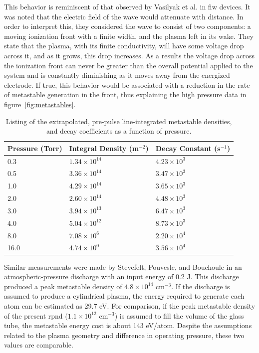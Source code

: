 This behavior is reminiscent of that observed by Vasilyak et al.
\cite{Vasilyak1994} in \acs{fiw} devices. It was noted that the electric field
of the wave would attenuate with distance. In order to interpret this, they
considered the wave to consist of two components: a moving ionization front with
a finite width, and the plasma left in its wake. They state that the plasma,
with its finite conductivity, will have some voltage drop across it, and as it
grows, this drop increases. As a results the voltage drop across the ionization
front can never be greater than the overall potential applied to the system and
is constantly diminishing as it moves away from the energized electrode. If
true, this behavior would be associated with a reduction in the rate of
metastable generation in the front, thus explaining the high pressure data in
figure~\ref{fig:metastables}.

\begin{table}
  \centering
  \caption{Listing of the extrapolated, pre-pulse line-integrated metastable 
  densities, and decay coefficients as a function of pressure.}
  \begin{tabular}{lll}
    \toprule
    Pressure (Torr) & Integral Density (m$^{-2}$) & Decay Constant (s$^{-1}$) \\
    \midrule
    0.3  & $1.34\times10^{14}$ & $4.23\times10^3$ \\
    0.5  & $3.36\times10^{14}$ & $3.47\times10^3$ \\
    1.0  & $4.29\times10^{14}$ & $3.65\times10^3$ \\
    2.0  & $2.60\times10^{14}$ & $4.48\times10^3$ \\
    3.0  & $3.94\times10^{13}$ & $6.47\times10^3$ \\
    4.0  & $5.04\times10^{12}$ & $8.73\times10^3$ \\
    8.0  & $7.08\times10^{6}$  & $2.20\times10^4$ \\
    16.0 & $4.74\times10^{0}$  & $3.56\times10^4$ \\
    \bottomrule
  \end{tabular}
  \label{tbl:prepulse}
\end{table}

Similar measurements were made by Stevefelt, Pouvesle, and Bouchoule
\cite{Pouvesle1988} in an atmospheric-pressure discharge with an input energy of
0.2 J. This discharge produced a peak metastable density of $4.8\times10^{14}$
cm$^{-3}$. If the discharge is assumed to produce a cylindrical plasma, the
energy required to generate each atom can be estimated as 29.7 eV. For
comparison, if the peak metastable density of the present \acs{rpnd}
($1.1\times10^{12}$ cm$^{-3}$) is assumed to fill the volume of the glass tube,
the metastable energy cost is about 143 eV/atom. Despite the assumptions related
to the plasma geometry and difference in operating pressure, these two values
are comparable.

